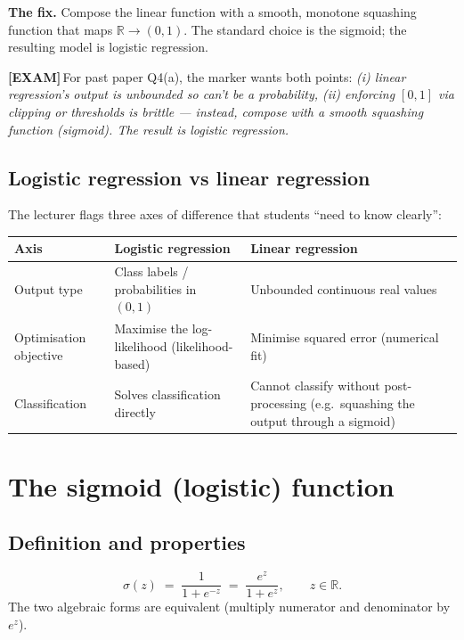 \documentclass[11pt, a4paper]{article}
\newcommand{\thead}[1]{\textbf{#1}}
\newcommand{\examflag}{\textcolor{tipBd}{\textbf{[EXAM]}}\,}
\begin{document}
\textbf{The fix.} Compose the linear function with a smooth, monotone squashing function that maps $\mathbb{R}\to(0,1)$. The standard choice is the sigmoid; the resulting model is logistic regression.

\examflag{}For past paper Q4(a), the marker wants both points: \emph{(i) linear regression's output is unbounded so can't be a probability, (ii) enforcing $[0,1]$ via clipping or thresholds is brittle — instead, compose with a smooth squashing function (sigmoid). The result is logistic regression.}

\subsection{Logistic regression vs linear regression}

The lecturer flags three axes of difference that students ``need to know clearly'':

\begin{tabularx}{\linewidth}{@{}lXX@{}}
\toprule
\thead{Axis} & \thead{Logistic regression} & \thead{Linear regression} \\
\midrule
Output type & Class labels / probabilities in $(0,1)$ & Unbounded continuous real values \\
Optimisation objective & Maximise the log-likelihood (likelihood-based) & Minimise squared error (numerical fit) \\
Classification & Solves classification directly & Cannot classify without post-processing (e.g.\ squashing the output through a sigmoid) \\
\bottomrule
\end{tabularx}

\section{The sigmoid (logistic) function}

\subsection{Definition and properties}

\begin{defbox}
\[
\sigma(z) \;=\; \frac{1}{1+e^{-z}} \;=\; \frac{e^z}{1+e^z}, \qquad z\in\mathbb{R}.
\]
The two algebraic forms are equivalent (multiply numerator and denominator by $e^z$).
\end{defbox}
\end{document}
